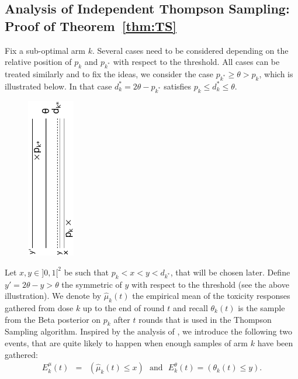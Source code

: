 
\subsection{Analysis of Independent Thompson Sampling: Proof of Theorem~\ref{thm:TS}} \label{proof:TS}

Fix a sub-optimal arm $k$. Several cases need to be considered depending on the relative position of $p_k$ and $p_{k^*}$ with respect to the threshold. All cases can be treated similarly and to fix the ideas, we consider the case $p_{k^*} \geq \theta > p_k$, which is illustrated below. In that case $d^*_k = 2\theta - p_{k^*}$ satisfies $p_k \leq d_{k}^* \leq \theta$.

\begin{figure}[h]\centering
 \includegraphics[height=7cm,angle=-90]{dosefinding/illustration}
\end{figure}

Let $x,y \in ]0,1[^2$ be such that $p_k < x < y < d_{k^*}$, that will be chosen later. Define $y' = 2\theta - y > \theta$ the symmetric of $y$ with respect to the threshold (see the above illustration). We denote by  $\hat{\mu}_k(t)$ the empirical mean of the toxicity responses gathered from dose $k$ up to the end of round $t$ and recall $\theta_k(t)$ is the sample from the Beta posterior on $p_k$ after $t$ rounds that is used in the Thompson Sampling algorithm. Inspired by the analysis of \cite{AGAISTAT13}, we introduce the following two events, that are quite likely to happen when enough samples of arm $k$ have been gathered: 
\begin{eqnarray*}
 E_k^\mu (t) & = & \left(\hat{\mu}_k(t) \leq x\right) \ \ \ \text{and} \ \ \ E_k^\theta (t)  =  \left({\theta}_k(t) \leq y\right).
\end{eqnarray*}

